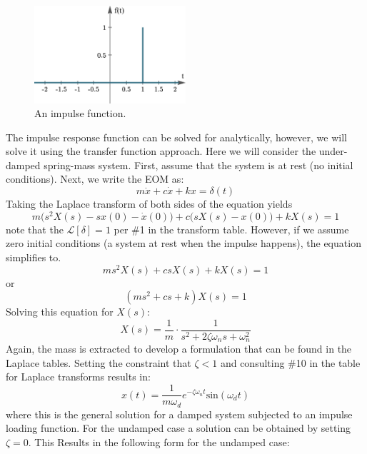 \documentclass[12pt,letter]{article}
\numberwithin{ex}{section} %
\numberwithin{re}{section} %
\newcommand{\Laplace}[1]{\ensuremath{\mathcal{L}{\left[#1\right]}}}
\begin{document}
\begin{figure}[H]
	\centering
	\includegraphics[width=0.5\textwidth]{../figures/impulse_time_history.png}
	\caption{An impulse function. }
\end{figure}

The impulse response function can be solved for analytically, however, we will solve it using the transfer function approach. Here we will consider the under-damped spring-mass system. First, assume that the system is at rest (no initial conditions). Next, we write the EOM as:
\begin{equation}
m\ddot{x} +c\dot{x} +kx = \delta(t)
\end{equation}
Taking the Laplace transform of both sides of the equation yields 
\begin{equation}
m\big(s^2X(s)-sx(0) - \dot{x}(0)\big) + c\big(sX(s)-x(0)\big) +kX(s) =1
\end{equation}
note that the $\Laplace{\delta}=1$ per \#1 in the transform table. However, if we assume zero initial conditions (a system at rest when the impulse happens), the equation simplifies to. 
\begin{equation}
ms^2X(s) + csX(s) +kX(s) =1
\end{equation}
or
\begin{equation}
(ms^2 + cs +k)X(s) =1
\end{equation}
Solving this equation for $X(s)$:
\begin{equation}
X(s) = \frac{1}{m} \cdot \frac{1}{s^2 + 2 \zeta \omega_n s + \omega_n^2}
\end{equation}
Again, the mass is extracted to develop a formulation that can be found in the Laplace tables. Setting the constraint that $\zeta<1$ and consulting \#10 in the table for Laplace transforms results in:
\begin{equation}
x(t) = \frac{1}{m \omega_d} e^{-\zeta \omega_n t} \text{sin}(\omega_dt)
\end{equation}
where this is the general solution for a damped system subjected to an impulse loading function. For the undamped case a solution can be obtained by setting $\zeta=0$. This Results in the following form for the undamped case:
\end{document}
